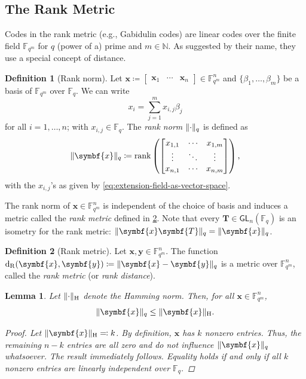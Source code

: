 \documentclass[version=last, paper=A4, parskip=half, oneside]{scrbook}
\theoremstyle{plain}
\newtheorem{lemma}{Lemma}
\theoremstyle{definition}
\newtheorem{definition}{Definition}
\theoremstyle{remark}
\renewcommand*{\vec}{\symbf}
\newcommand*{\mat}{\symbf}
\DeclareMathOperator{\rank}{rank}
\newcommand*{\GL}{\ensuremath{\mathsf{GL}}}
\newcommand*{\FF}{\ensuremath{\mathbb{F}}}
\newcommand*{\NN}{\ensuremath{\mathbb{N}}}
\DeclarePairedDelimiter{\norm}{\lVert}{\rVert}
\newcommand*{\normH}[1]{\ensuremath{\norm{#1}_{\mathrm{H}}}}
\newcommand*{\normR}[2]{\ensuremath{\norm{#1}_{#2}}}
\DeclareMathOperator{\dR}{d_R}
\begin{document}
\subsection{The Rank Metric}

Codes in the rank metric (e.g., Gabidulin codes) are linear codes over the
finite field \(\FF_{q^m}\) for \(q\) (power of a) prime and \(m \in \NN\).  As
suggested by their name, they use a special concept of distance.

\begin{definition}[Rank norm]
  Let
  \(\vec{x} \coloneqq \begin{bmatrix} \vec{x}_1 & \cdots & \vec{x}_n \end{bmatrix} \in \FF_{q^m}^n\)
  and \(\{\beta_1, \ldots, \beta_m\}\) be a basis of \(\FF_{q^m}\) over
  \(\FF_q\).  We can write
  \begin{equation}\label{eq:extension-field-as-vector-space}
    x_i = \sum_{j = 1}^m x_{i, j} \beta_j
  \end{equation}
  for all \(i = 1, \ldots, n\); with \(x_{i, j} \in \FF_q\).  The \emph{rank
    norm} \(\normR{\cdot}{q}\) is defined as
  \[
    \normR{\vec{x}}{q} \coloneqq
    \rank\left(
      \begin{bmatrix}
        x_{1, 1} & \cdots & x_{1, m} \\
        \vdots & \ddots & \vdots \\
        x_{n, 1} & \cdots & x_{n, m}
      \end{bmatrix}
    \right)\text,
  \]
  with the \(x_{i, j}\)'s as given by \cref{eq:extension-field-as-vector-space}.
\end{definition}

The rank norm of \(\vec{x} \in \FF_{q^m}^n\) is independent of the choice of
basis and induces a metric called the \emph{rank metric} defined in
\cref{def:rank-metric}.  Note that every \(\mat{T} \in \GL_n(\FF_q)\) is an
isometry for the rank metric:
\(\normR{\vec{x} \mat{T}}{q} = \normR{\vec{x}}{q}\).

\begin{definition}[Rank metric]\label{def:rank-metric}
  Let \(\vec{x}, \vec{y} \in \FF_{q^m}^n\).  The function
  \(\dR(\vec{x}, \vec{y}) \coloneqq \normR{\vec{x} - \vec{y}}{q}\) is a metric
  over \(\FF_{q^m}^n\), called the \emph{rank metric} (or \emph{rank distance}).
\end{definition}

\begin{lemma}
  Let \(\normH{\cdot}\) denote the Hamming norm.  Then, for all
  \(\vec{x} \in \FF_{q^m}^n\),
  \[
    \normR{\vec{x}}{q} \le \normH{\vec{x}}\text.
  \]
  \begin{proof}
    Let \(\normH{\vec{x}} \eqqcolon k\).  By definition, \(\vec{x}\) has \(k\)
    nonzero entries.  Thus, the remaining \(n - k\) entries are all zero and do
    not influence \(\normR{\vec{x}}{q}\) whatsoever.  The result immediately
    follows.  Equality holds if and only if all \(k\) nonzero entries are
    linearly independent over \(\FF_q\).
  \end{proof}
\end{lemma}
\end{document}
